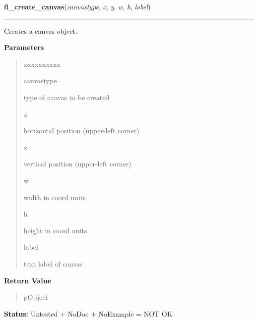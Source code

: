     \label{xformslib:library:fl_create_canvas}

    \vspace{0.5ex}

\hspace{.8\funcindent}\begin{boxedminipage}{\funcwidth}

    \raggedright \textbf{fl\_create\_canvas}(\textit{canvastype}, \textit{x}, \textit{y}, \textit{w}, \textit{h}, \textit{label})

    \vspace{-1.5ex}

    \rule{\textwidth}{0.5\fboxrule}
\setlength{\parskip}{2ex}
    Creates a canvas object.

\setlength{\parskip}{1ex}
      \textbf{Parameters}
      \vspace{-1ex}

      \begin{quote}
        \begin{Ventry}{xxxxxxxxxx}

          \item[canvastype]

          type of canvas to be created

          \item[x]

          horizontal position (upper-left corner)

          \item[x]

          vertical position (upper-left corner)

          \item[w]

          width in coord units

          \item[h]

          height in coord units

          \item[label]

          text label of canvas

        \end{Ventry}

      \end{quote}

      \textbf{Return Value}
    \vspace{-1ex}

      \begin{quote}
      pObject

      \end{quote}

\textbf{Status:} Untested + NoDoc + NoExample = NOT OK



    \end{boxedminipage}


